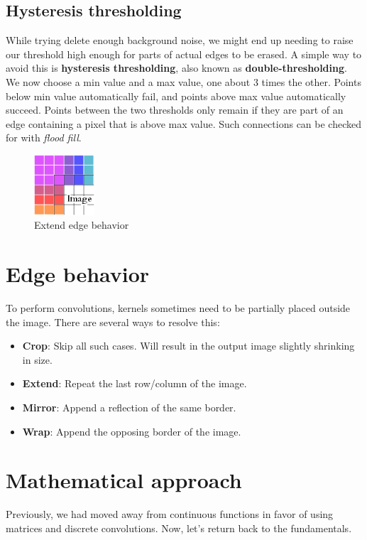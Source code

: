 \documentclass{article}
\begin{document}
\subsection{Hysteresis thresholding}
While trying delete enough background noise, we might end up needing to raise our threshold high enough for parts of actual edges to be erased. A simple way to avoid this is \textbf{hysteresis thresholding}, also known as \textbf{double-thresholding}. We now choose a min value and a max value, one about 3 times the other. Points below min value automatically fail, and points above max value automatically succeed. Points between the two thresholds only remain if they are part of an edge containing a pixel that is above max value. Such connections can be checked for with \textit{flood fill}.

\begin{figure}
  \begin{center}
    \vspace{-20pt}
    \includegraphics[width=0.20\textwidth]{Extend.png}
    \vspace{-17.5pt}
  \end{center}
  \caption{Extend edge behavior}
  \vspace{-50pt}
\end{figure}
\section{Edge behavior}
To perform convolutions, kernels sometimes need to be partially placed outside the image. There are several ways to resolve this:
\begin{itemize}
  \item \textbf{Crop}: Skip all such cases. Will result in the output image slightly shrinking in size.
  \item \textbf{Extend}: Repeat the last row/column of the image.
  \item \textbf{Mirror}: Append a reflection of the same border.
  \item \textbf{Wrap}: Append the opposing border of the image.
\end{itemize}

\section{Mathematical approach}
Previously, we had moved away from continuous functions in favor of using matrices and discrete convolutions. Now, let's return back to the fundamentals.
\end{document}
